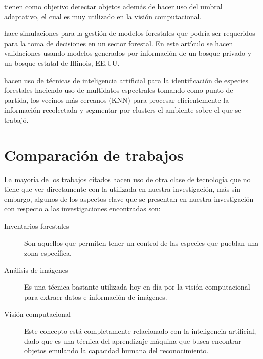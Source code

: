 \citet{rf3} tienen como objetivo detectar objetos además de hacer uso del umbral adaptativo, el cual es muy utilizado en la visión computacional. %

\citet{rf9} hace simulaciones para la gestión de modelos forestales que podría ser requeridos para la toma de decisiones en un sector forestal. En este artículo se hacen validaciones usando modelos generados por información de un bosque privado y un bosque estatal de Illinois, EE.UU.

\citet{rf10} hacen uso de técnicas de inteligencia artificial para la identificación  de especies forestales haciendo uso de multidatos espectrales tomando como punto de partida, los vecinos más cercanos (KNN) para procesar eficientemente la información recolectada y segmentar por clusters el ambiente sobre el que se trabajó.

\pagebreak
 
\section{Comparación de trabajos}
La mayoría de los trabajos citados hacen uso de otra clase de tecnología que no tiene que ver directamente con la utilizada en nuestra investigación, más sin embargo, algunos de los aspectos clave que se presentan en nuestra investigación con respecto a las investigaciones encontradas son:

\begin{description}
\item[Inventarios forestales]{ Son aquellos que permiten tener un control de las especies que pueblan una zona específica.}
\end{description}

\begin{description}
\item[Análisis de imágenes]{Es una técnica bastante utilizada hoy en día por la visión computacional para extraer datos e información de imágenes.}
\end{description}

\begin{description}
\item[Visión computacional]{Este concepto está completamente relacionado con la inteligencia artificial, dado que es una  técnica del aprendizaje máquina que busca encontrar objetos emulando la capacidad humana del reconocimiento.}
\end{description}

